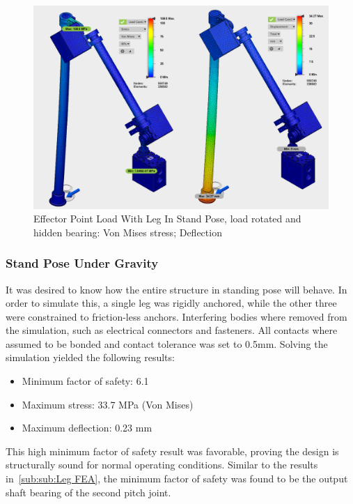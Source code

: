 \begin{figure}[h]
\centering
\includegraphics[width=1.0\columnwidth]{./img/aquaShoko-v3dot3-FEA-HidenBearing-2.png}
\caption{Effector Point Load With Leg In Stand Pose, load rotated and hidden bearing: Von Mises stress; Deflection}
\label{fig:test two pressure check}
\end{figure}











\subsubsection{Stand Pose Under Gravity}\label{sub:sub:Stand FEA} It was desired to know how the entire structure in standing pose will behave. In order to simulate this, a single leg was rigidly anchored, while the other three were constrained to friction-less anchors. Interfering bodies where removed from the simulation, such as electrical connectors and fasteners. All contacts where assumed to be bonded and contact tolerance was set to 0.5mm.
Solving the simulation yielded the following results:
 \begin{itemize}
     \item Minimum factor of safety: 6.1
     \item Maximum stress: 33.7 MPa (Von Mises)
     \item Maximum deflection: 0.23 mm 
 \end{itemize}
 
This high minimum factor of safety result was favorable, proving the design is structurally sound for normal operating conditions. Similar to the results in~\ref{sub:sub:Leg FEA}, the minimum factor of safety was found to be the output shaft bearing of the second pitch joint.





